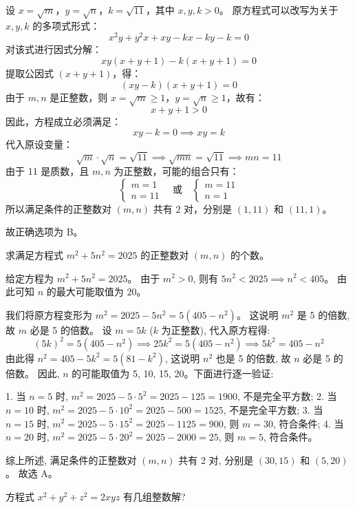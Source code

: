 \begin{questions}
\begin{solution}
设 $x = \sqrt{m}$，$y = \sqrt{n}$，$k = \sqrt{11}$，其中 $x, y, k > 0$。
原方程式可以改写为关于 $x, y, k$ 的多项式形式：
\[
x^2y + y^2x + xy - kx - ky - k = 0
\]
对该式进行因式分解：
\[
xy(x + y + 1) - k(x + y + 1) = 0
\]
提取公因式 $(x + y + 1)$，得：
\[
(xy - k)(x + y + 1) = 0
\]
由于 $m, n$ 是正整数，则 $x = \sqrt{m} \ge 1$，$y = \sqrt{n} \ge 1$，故有：
\[
x + y + 1 > 0
\]
因此，方程成立必须满足：
\[
xy - k = 0 \implies xy = k
\]
代入原设变量：
\[
\sqrt{m} \cdot \sqrt{n} = \sqrt{11} \implies \sqrt{mn} = \sqrt{11} \implies mn = 11
\]
由于 11 是质数，且 $m, n$ 为正整数，可能的组合只有：
\[
\begin{cases} m = 1 \\ n = 11 \end{cases} \quad \text{或} \quad \begin{cases} m = 11 \\ n = 1 \end{cases}
\]
所以满足条件的正整数对 $(m, n)$ 共有 2 对，分别是 $(1, 11)$ 和 $(11, 1)$。

故正确选项为 B。
\end{solution}

\question 求满足方程式 $m^2 + 5n^2 = 2025$ 的正整数对 $(m, n)$ 的个数。

\begin{solution}
给定方程为 $m^2 + 5n^2 = 2025$。
由于 $m^2 > 0$, 则有 $5n^2 < 2025 \implies n^2 < 405$。
由此可知 $n$ 的最大可能取值为 $20$。

我们将原方程变形为 $m^2 = 2025 - 5n^2 = 5(405 - n^2)$。
这说明 $m^2$ 是 5 的倍数, 故 $m$ 必是 5 的倍数。
设 $m = 5k$ ($k$ 为正整数), 代入原方程得:
\[
(5k)^2 = 5(405 - n^2) \implies 25k^2 = 5(405 - n^2) \implies 5k^2 = 405 - n^2
\]
由此得 $n^2 = 405 - 5k^2 = 5(81 - k^2)$, 这说明 $n^2$ 也是 5 的倍数, 故 $n$ 必是 5 的倍数。
因此, $n$ 的可能取值为 5, 10, 15, 20。下面进行逐一验证:

1. 当 $n = 5$ 时, $m^2 = 2025 - 5 \cdot 5^2 = 2025 - 125 = 1900$, 不是完全平方数;
2. 当 $n = 10$ 时, $m^2 = 2025 - 5 \cdot 10^2 = 2025 - 500 = 1525$, 不是完全平方数;
3. 当 $n = 15$ 时, $m^2 = 2025 - 5 \cdot 15^2 = 2025 - 1125 = 900$, 则 $m = 30$, 符合条件;
4. 当 $n = 20$ 时, $m^2 = 2025 - 5 \cdot 20^2 = 2025 - 2000 = 25$, 则 $m = 5$, 符合条件。

综上所述, 满足条件的正整数对 $(m, n)$ 共有 2 对, 分别是 $(30, 15)$ 和 $(5, 20)$。
故选 A。
\end{solution}

\question 方程式 $x^2 + y^2 + z^2 = 2xyz$ 有几组整数解?


\end{questions}
